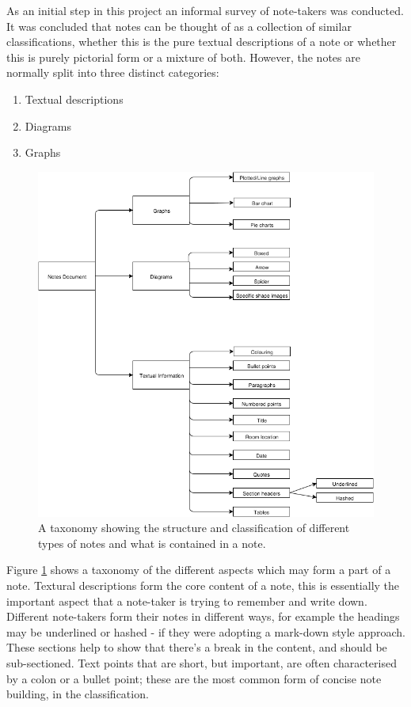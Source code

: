 As an initial step in this project an informal survey of note-takers was conducted. It was concluded that notes can be thought of as a collection of similar classifications, whether this is the pure textual descriptions of a note or whether this is purely pictorial form or a mixture of both. However, the notes are normally split into three distinct categories:
\begin{enumerate}
	\item Textual descriptions
	\item Diagrams
	\item Graphs
\end{enumerate}
\begin{figure}[h!]
\includegraphics[scale=0.5]{images/taxonomy}
\centering
\caption{A taxonomy showing the structure and classification of different types of notes and what is contained in a note.}
 \label{fig:taxonomyofnotes}
\end{figure}

Figure \ref{fig:taxonomyofnotes} shows a taxonomy of the different aspects which may form a part of a note. Textural descriptions form the core content of a note, this is essentially the important aspect that a note-taker is trying to remember and write down. Different note-takers form their notes in different ways, for example the headings may be underlined or hashed - if they were adopting a mark-down style approach. These sections help to show that there's a break in the content, and should be sub-sectioned. Text points that are short, but important, are often characterised by a colon or a bullet point; these are the most common form of concise note building, in the classification.

